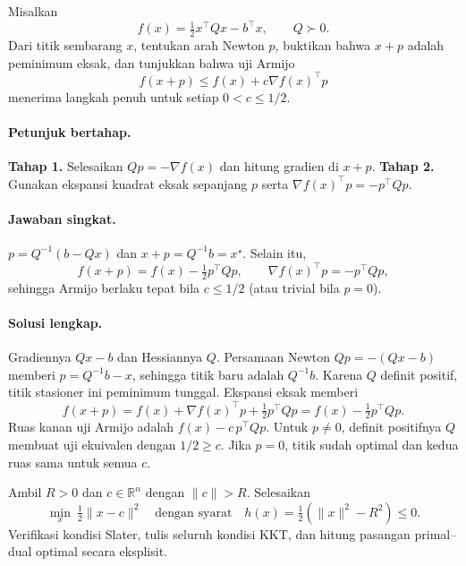\begin{exercise}
\label{orig03:midterm:exercise:0004}
Misalkan
\[
 f(x)=\tfrac12x^\top Qx-b^\top x,
 \qquad Q\succ0.
\]
Dari titik sembarang $x$, tentukan arah Newton $p$, buktikan bahwa $x+p$
adalah peminimum eksak, dan tunjukkan bahwa uji Armijo
\[
 f(x+p)\le f(x)+c\nabla f(x)^\top p
\]
menerima langkah penuh untuk setiap $0<c\le1/2$.
\end{exercise}

\paragraph{Petunjuk bertahap.}
\label{orig03:midterm:hint:0004}
\textbf{Tahap 1.} Selesaikan $Qp=-\nabla f(x)$ dan hitung gradien di $x+p$.
\textbf{Tahap 2.} Gunakan ekspansi kuadrat eksak sepanjang $p$ serta
$\nabla f(x)^\top p=-p^\top Qp$.

\paragraph{Jawaban singkat.}
\label{orig03:midterm:answer:0004}
$p=Q^{-1}(b-Qx)$ dan $x+p=Q^{-1}b=x^\star$. Selain itu,
\[
 f(x+p)=f(x)-\tfrac12p^\top Qp,
 \qquad \nabla f(x)^\top p=-p^\top Qp,
\]
sehingga Armijo berlaku tepat bila $c\le1/2$ (atau trivial bila $p=0$).

\paragraph{Solusi lengkap.}
\label{orig03:midterm:solution:0004}
Gradiennya $Qx-b$ dan Hessiannya $Q$. Persamaan Newton
$Qp=-(Qx-b)$ memberi $p=Q^{-1}b-x$, sehingga titik baru adalah
$Q^{-1}b$. Karena $Q$ definit positif, titik stasioner ini peminimum tunggal.
Ekspansi eksak memberi
\[
 f(x+p)=f(x)+\nabla f(x)^\top p+\tfrac12p^\top Qp
 =f(x)-\tfrac12p^\top Qp.
\]
Ruas kanan uji Armijo adalah
$f(x)-c\,p^\top Qp$. Untuk $p\ne0$, definit positifnya $Q$ membuat uji
ekuivalen dengan $1/2\ge c$. Jika $p=0$, titik sudah optimal dan kedua ruas
sama untuk semua $c$.

\begin{exercise}
\label{orig03:midterm:exercise:0005}
Ambil $R>0$ dan $c\in\mathbb R^n$ dengan $\lVert c\rVert>R$. Selesaikan
\[
 \min_x\ \tfrac12\lVert x-c\rVert^2
 \quad\text{dengan syarat}\quad
 h(x)=\tfrac12(\lVert x\rVert^2-R^2)\le0.
\]
Verifikasi kondisi Slater, tulis seluruh kondisi KKT, dan hitung pasangan
primal--dual optimal secara eksplisit.
\end{exercise}

